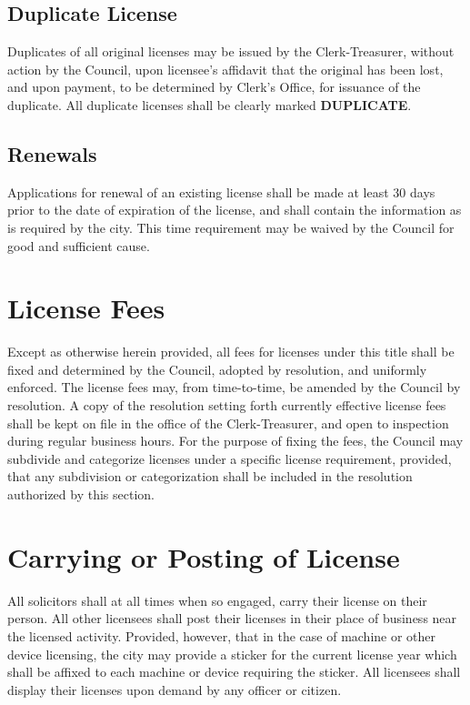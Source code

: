 \subsection{Duplicate License}
Duplicates of all original licenses may be issued by the Clerk-Treasurer, without action by the Council, upon licensee’s affidavit that the original has been lost, and upon payment, to be determined by Clerk’s Office, for issuance of the duplicate.  All duplicate licenses shall be clearly marked \textbf{DUPLICATE}.
\subsection{Renewals}
Applications for renewal of an existing license shall be made at least 30 days prior to the date of expiration of the license, and shall contain the information as is required by the city.  This time requirement may be waived by the Council for good and sufficient cause.

\section{License Fees}
Except as otherwise herein provided, all fees for licenses under this title shall be fixed and determined by the Council, adopted by resolution, and uniformly enforced.  The license fees may, from time-to-time, be amended by the Council by resolution.  A copy of the resolution setting forth currently effective license fees shall be kept on file in the office of the Clerk-Treasurer, and open to inspection during regular business hours.  For the purpose of fixing the fees, the Council may subdivide and categorize licenses under a specific license requirement, provided, that any subdivision or categorization shall be included in the resolution authorized by this section.

\section{Carrying or Posting of License}
All solicitors shall at all times when so engaged, carry their license on their person.  All other licensees shall post their licenses in their place of business near the licensed activity.  Provided, however, that in the case of machine or other device licensing, the city may provide a sticker for the current license year which shall be affixed to each machine or device requiring the sticker.  All licensees shall display their licenses upon demand by any officer or citizen.

